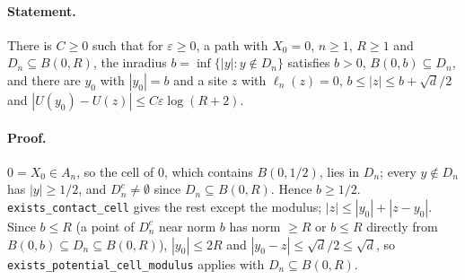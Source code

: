 \paragraph{Statement.} There is $C\geq0$ such that for $\varepsilon\geq0$, a path with $X_0=0$, $n\geq1$, $R\geq1$ and $D_n\subseteq B(0,R)$, the inradius
$b=\inf\{|y|:y\notin D_n\}$ satisfies $b>0$, $B(0,b)\subseteq D_n$, and there are $y_0$ with $|y_0|=b$ and a site $z$ with $\ell_n(z)=0$,
$b\leq|z|\leq b+\sqrt d/2$ and $|U(y_0)-U(z)|\leq C\varepsilon\log(R+2)$.
\paragraph{Proof.} $0=X_0\in A_n$, so the cell of $0$, which contains $B(0,1/2)$, lies in $D_n$; every $y\notin D_n$ has $|y|\geq1/2$, and $D_n^c\neq\emptyset$
since $D_n\subseteq B(0,R)$. Hence $b\geq1/2$. \texttt{exists\_contact\_cell} gives the rest except the modulus; $|z|\leq|y_0|+|z-y_0|$.
Since $b\leq R$ (a point of $D_n^c$ near norm $b$ has norm $\geq R$ or $b\leq R$ directly from $B(0,b)\subseteq D_n\subseteq B(0,R)$), $|y_0|\leq2R$ and
$|y_0-z|\leq\sqrt d/2\leq\sqrt d$, so \texttt{exists\_potential\_cell\_modulus} applies with $D_n\subseteq B(0,R)$.
